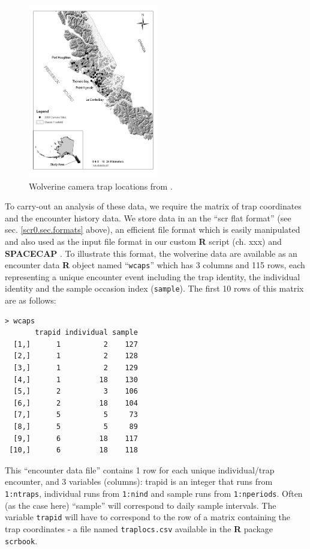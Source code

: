 \begin{figure}
\begin{center}
\includegraphics[height=3in]{figs/wolverinelocs}
\end{center}
\caption{Wolverine camera trap locations from \citet{magoun_etal:2011}.}
\label{scr0.fig.wolverinelocs}
\end{figure}

To carry-out an analysis of these data, we require the matrix of trap
coordinates and the encounter history data.  We store data in an
the
``scr flat format'' (see sec.
\ref{scr0.sec.formats}
 above), an
efficient file format which is easily manipulated and also used as the
input file format in our custom {\bf R} script (ch. xxx) and {\bf
  SPACECAP}
 \citep{gopalaswamy_etal:2012}.
 To illustrate this
format, the wolverine data are available as an encounter data {\bf R} object
named ``\mbox{\tt wcaps}'' which has 3 columns and 115 rows, each representing a
unique encounter event including the trap identity, the individual
identity and the sample occasion index (\mbox{\tt sample}).  
The first 10 rows of this matrix are as
follows:
\begin{verbatim}
> wcaps
       trapid individual sample
  [1,]      1          2    127
  [2,]      1          2    128
  [3,]      1          2    129
  [4,]      1         18    130
  [5,]      2          3    106
  [6,]      2         18    104
  [7,]      5          5     73
  [8,]      5          5     89
  [9,]      6         18    117
 [10,]      6         18    118
\end{verbatim}

This ``encounter data file'' contains 1 row for each unique
individual/trap encounter, and 3 variables (columns): trapid is an
integer that runs from \mbox{\tt 1:ntraps}, individual runs from
\mbox{\tt 1:nind} and
sample runs from \mbox{\tt 1:nperiods}. Often (as the case here) ``sample'' will
correspond to daily sample intervals. The variable \mbox{\tt trapid} will have to
correspond to the row of a matrix containing the trap coordinates - a
file named \mbox{\tt traplocs.csv} available in the {\bf R} package
\mbox{\tt scrbook}.

